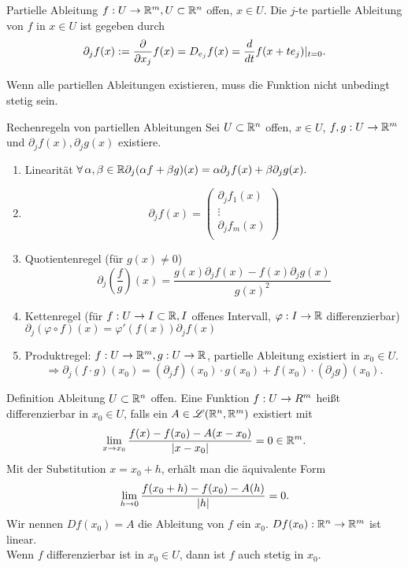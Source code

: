 \documentclass[main.tex]{subfiles}
\begin{document}
\begin{karte}{Partielle Ableitung}
    \( f : U \rightarrow \mathbb{R}^m, U \subset \mathbb{R}^n \) offen, \( x\in U \).
    Die \(j\)-te partielle Ableitung von \(f\) in \(x \in U\) 
    ist gegeben durch
    \[ \partial_j f(x) := \frac{\partial}{\partial x_j} f(x) 
    = D_{e_j} f(x) = \frac{d}{dt} f(x + t e_j) \vert_{t=0}. \]

    Wenn alle partiellen Ableitungen existieren, muss die Funktion 
    nicht unbedingt stetig sein.
\end{karte}
\begin{karte}{Rechenregeln von partiellen Ableitungen}
    Sei \( U \subset \mathbb{R}^n \) offen, \( x\in U \), 
    \( f,g : U \rightarrow \mathbb{R}^m \) und 
    \( \partial_j f(x), \partial_j g(x) \) existiere.
    \begin{enumerate}
        \item Linearität \( \forall \alpha, \beta \in \R 
        \partial_j (\alpha f + \beta g)(x) 
        = \alpha \partial_j f(x) + \beta \partial_j g(x). \)
        \item \[ \partial_j f(x) = \begin{pmatrix}
            \partial_j f_1(x) \\
            \vdots \\
            \partial_j f_m(x) \\
        \end{pmatrix} \]
        \item Quotientenregel (für \( g(x) \neq 0 \))
        \[ \partial_j \left(\frac{f}{g}\right)(x) 
        = \frac{g(x) \partial_j f(x) - f(x) \partial_j g(x)}{g(x)^2} \]
        \item Kettenregel (für \( f : U \rightarrow I \subset \mathbb{R}, 
        I \) offenes Intervall, 
        \( \varphi : I \rightarrow \mathbb{R} \) differenzierbar)
        \( \partial_j (\varphi \circ f)(x) 
        = \varphi'(f(x)) \partial_j f(x) \)
        \item Produktregel: \( f : U \rightarrow \mathbb{R}^m, 
        g : U \rightarrow \mathbb{R} \), partielle Ableitung 
        existiert in \( x_0 \in U \).
        \[ \Rightarrow \partial_j(f\cdot g)(x_0) 
        = (\partial_j f)(x_0)\cdot g(x_0) + f(x_0)\cdot (\partial_j g)(x_0). \]
    \end{enumerate}
\end{karte}

\begin{karte}{Definition Ableitung}
    \( U \subset \mathbb{R}^n \) offen. Eine Funktion \(f : U \rightarrow R^m\)
    heißt differenzierbar in \(x_0 \in U\), falls ein
    \( A \in \mathscr{L}(\mathbb{R}^n, \mathbb{R}^m) \) existiert mit
    \[ \lim\limits_{x\rightarrow x_0} \frac{f(x) -f(x_0) - A(x-x_0)}{\left| x-x_0 \right|} 
    = 0 \in \mathbb{R}^m. \]
    Mit der Substitution \( x = x_0 + h \), 
    erhält man die äquivalente Form 
    \[ \lim\limits_{h\rightarrow 0} \frac{ f(x_0 + h) - f(x_0) - A(h) }{\left| h \right|} = 0. \]
    Wir nennen \( Df(x_0) = A \) die Ableitung von \(f\) ein \(x_0\). 
    \( Df(x_0) : \mathbb{R}^n \rightarrow \mathbb{R}^m \) ist linear.\\
    Wenn \( f \) differenzierbar ist in \( x_0 \in U \), dann ist 
    \( f \) auch stetig in \( x_0 \).
\end{karte}
\end{document}
